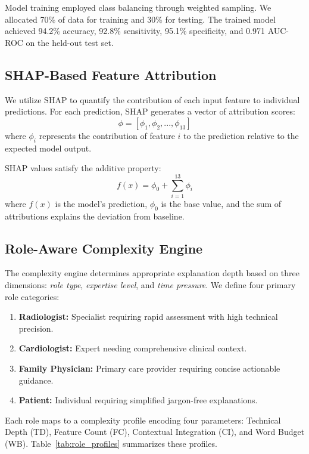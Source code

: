 \documentclass{ieeeaccess}
\begin{document}
Model training employed class balancing through weighted sampling. We allocated 70\% of data for training and 30\% for testing. The trained model achieved 94.2\% accuracy, 92.8\% sensitivity, 95.1\% specificity, and 0.971 AUC-ROC on the held-out test set.

\subsection{SHAP-Based Feature Attribution}

We utilize SHAP to quantify the contribution of each input feature to individual predictions. For each prediction, SHAP generates a vector of attribution scores:
\begin{equation}
\phi = [\phi_1, \phi_2, ..., \phi_{13}]
\end{equation}
where $\phi_i$ represents the contribution of feature $i$ to the prediction relative to the expected model output.

SHAP values satisfy the additive property:
\begin{equation}
f(x) = \phi_0 + \sum_{i=1}^{13} \phi_i
\end{equation}
where $f(x)$ is the model's prediction, $\phi_0$ is the base value, and the sum of attributions explains the deviation from baseline.

\subsection{Role-Aware Complexity Engine}

The complexity engine determines appropriate explanation depth based on three dimensions: \textit{role type}, \textit{expertise level}, and \textit{time pressure}. We define four primary role categories:

\begin{enumerate}
\item \textbf{Radiologist:} Specialist requiring rapid assessment with high technical precision.
\item \textbf{Cardiologist:} Expert needing comprehensive clinical context.
\item \textbf{Family Physician:} Primary care provider requiring concise actionable guidance.
\item \textbf{Patient:} Individual requiring simplified jargon-free explanations.
\end{enumerate}

Each role maps to a complexity profile encoding four parameters: Technical Depth (TD), Feature Count (FC), Contextual Integration (CI), and Word Budget (WB). Table~\ref{tab:role_profiles} summarizes these profiles.
\end{document}
